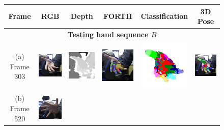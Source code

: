\begin{figure}
	\centering
	\begin{tabular}{@{}cc@{}c@{}c@{}c@{}c@{}}
		\textbf{Frame} & \textbf{RGB} & \textbf{Depth} & \textbf{FORTH} & \textbf{Classification} & \textbf{3D Pose} \\ 
		\hline 
		\multicolumn{6}{c}{\textbf{Testing hand sequence $B$}} \\ 
		\hline 
		\raisebox{1.3cm}{\parbox{2cm}{\centering (a)\\Frame 303}} & 
		\includegraphics[width=2.4cm]{fig/hand/qual/rgb/image_0303.png} &
		\includegraphics[width=2.4cm]{fig/hand/qual/depth/image_0303.png} &
		\includegraphics[width=2.4cm]{fig/hand/qual/forth/image_0303.png} &
		\includegraphics[width=2.4cm]{fig/hand/qual/class/class-303.png} &
		\includegraphics[width=2.4cm]{fig/hand/qual/vote/image_0303.png}
		\label{fig/hand/multi1} \\
		\raisebox{1cm}{\parbox{2cm}{\centering (b)\\Frame 520}} & 
		\includegraphics[width=2.4cm]{fig/hand/qual/rgb/image_0520.png} &

\end{tabular}
\end{figure}
